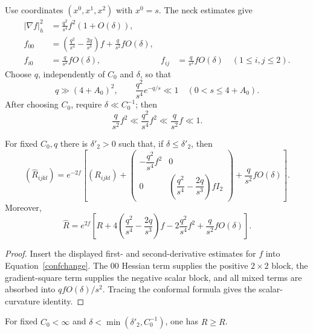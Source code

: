 Use coordinates $(x^0,x^1,x^2)$ with $x^0=s$. The neck estimates give
\[
\begin{aligned}
|\nabla f|_h^2&=\frac{q^2}{s^4}f^2(1+O(\delta)),\\
f_{00}&=\left(\frac{q^2}{s^4}-\frac{2q}{s^3}\right)f
+\frac q{s^2}fO(\delta),\\
f_{i0}&=\frac q{s^2}fO(\delta),
&f_{ij}&=\frac q{s^2}fO(\delta)\quad(1\leq i,j\leq2).
\end{aligned}
\]
Choose $q$, independently of $C_0$ and $\delta$, so that
\begin{equation}
\label{qeqn}
  q\gg(4+A_0)^2,
  \qquad
  \frac{q^2}{s^4}e^{-q/s}\ll1
  \quad(0<s\leq4+A_0).
\end{equation}
After choosing $C_0$, require $\delta\ll C_0^{-1}$; then
\[
  \frac q{s^2}f^2\ll\frac{q^2}{s^4}f^2
  \ll\frac q{s^2}f\ll1.
\]

\begin{corollary}
\label{cor:conformal-curvature-formula}
\label{delta0}
For fixed $C_0,q$ there is $\delta'_2>0$ such that, if
$\delta\leq\delta'_2$, then
\begin{equation}
\label{maineqn}
(\widehat R_{ijkl})=e^{-2f}\left[
(R_{ijkl})+
\begin{pmatrix}
-\dfrac{q^2}{s^4}f^2&0\\
0&\left(\dfrac{q^2}{s^4}-\dfrac{2q}{s^3}\right)fI_2
\end{pmatrix}
+\frac q{s^2}fO(\delta)\right].
\end{equation}
Moreover,
\[
  \widehat R=e^{2f}\left[
  R+4\left(\frac{q^2}{s^4}-\frac{2q}{s^3}\right)f
  -2\frac{q^2}{s^4}f^2+\frac q{s^2}fO(\delta)\right].
\]
\end{corollary}

\begin{proof}
\sketch
Insert the displayed first- and second-derivative estimates for $f$ into
Equation~\eqref{confchange}. The $00$ Hessian term supplies the positive
$2\times2$ block, the gradient-square term supplies the negative scalar block,
and all mixed terms are absorbed into $qfO(\delta)/s^2$. Tracing the conformal
formula gives the scalar-curvature identity.
\end{proof}

\begin{corollary}
\label{cor:scalar-curvature-nondecreasing-conformal}

\label{Rcompar}
For fixed $C_0<\infty$ and
$\delta<\min(\delta'_2,C_0^{-1})$, one has $\widehat R\geq R$.
\end{corollary}

